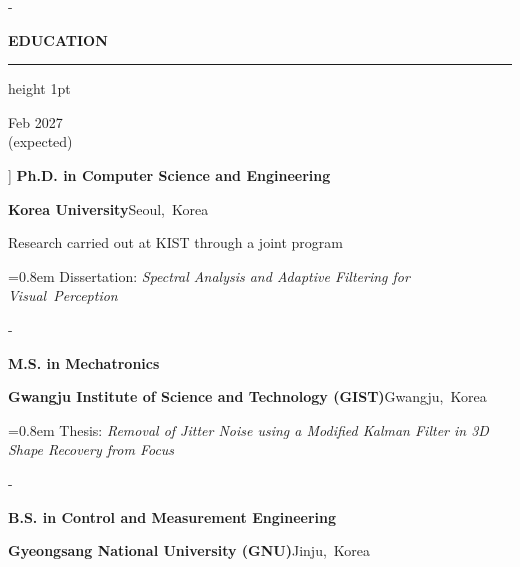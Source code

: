 \documentclass[11pt,a4paper]{article}
\makeatletter
\newcommand{\keepspace}[1]{\par\penalty\z@\begingroup\setlength{\dimen@}{#1}%
  \dimen@ii\pagegoal\advance\dimen@ii-\pagetotal
  \ifdim\dimen@>\dimen@ii\ifdim\dimen@ii>\z@\vfill\fi\break\fi\endgroup}
\newcommand{\cvsection}[2][8]{\par\vspace{8pt}\keepspace{#1\baselineskip}%
  {\color{cvblue}\large\bfseries\MakeUppercase{#2}\par}\vspace{3pt}%
  {\color{cvblue}\hrule height 1pt}\vspace{8pt}}
\newlength{\datecol}\setlength{\datecol}{0.95in}
\newlength{\dategap}\setlength{\dategap}{0.16in}
\newenvironment{entries}{\begin{description}[leftmargin=\dimexpr\datecol+\dategap\relax,
    labelwidth=\datecol, labelsep=\dategap, align=right, font=\normalfont,
    itemsep=7pt, topsep=0pt, parsep=0pt, partopsep=0pt, before=\raggedright]}{\end{description}}
\newcommand{\when}[1]{\raisebox{0pt}[\height][0pt]{\parbox[t]{\datecol}{\raggedleft #1}}}
\newcommand{\detail}[1]{{\leftskip=0.8em #1\par}}            %
\makeatother
\begin{document}
\cvsection[5]{Education}
\begin{entries}
  \item[\when{Feb 2027\\(expected)}] \textbf{Ph.D. in Computer Science and Engineering}\par
    \textbf{Korea University}\enspace Seoul,~Korea\par
    Research carried out at KIST through a joint program\par
    \detail{Dissertation: \textit{Spectral Analysis and Adaptive Filtering for Visual~Perception}}
  \keepspace{4.5\baselineskip}%
  \item[2018] \textbf{M.S. in Mechatronics}\par
    \textbf{Gwangju Institute of Science and Technology (GIST)}\enspace Gwangju,~Korea\par
    \detail{Thesis: \textit{Removal of Jitter Noise using a Modified Kalman Filter in 3D Shape
      Recovery from Focus}}
  \keepspace{2.5\baselineskip}%
  \item[2016] \textbf{B.S. in Control and Measurement Engineering}\par
    \textbf{Gyeongsang National University (GNU)}\enspace Jinju,~Korea
\end{entries}
\end{document}
